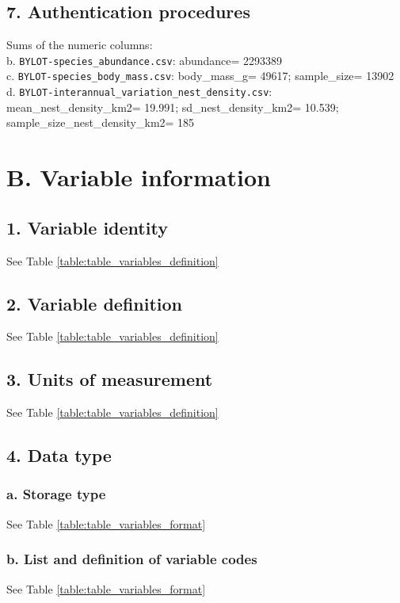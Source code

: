\documentclass[a4paper,twoside,12pt]{article}
\begin{document}
                        \subsection*{7. Authentication procedures}
                        Sums of the numeric columns: \\
                        b. \texttt{BYLOT-species\_abundance.csv}: abundance= 2293389\\
                        c. \texttt{BYLOT-species\_body\_mass.csv}: body\_mass\_g= 49617; sample\_size= 13902\\
                        d. \texttt{BYLOT-interannual\_variation\_nest\_density.csv}: mean\_nest\_density\_km2= 19.991; sd\_nest\_density\_km2= 10.539; sample\_size\_nest\_density\_km2= 185
                        
    \section*{B. Variable information}
                \subsection*{1. Variable identity} See Table \ref{table:table_variables_definition}
        \subsection*{2. Variable definition} See Table \ref{table:table_variables_definition}
        \subsection*{3. Units of measurement} See Table \ref{table:table_variables_definition}
        \newpage
        
        
       \newpage
        
        \subsection*{4. Data type}
                    \subsubsection*{a. Storage type} See Table \ref{table:table_variables_format}
                    \subsubsection*{b. List and definition of variable codes} See Table \ref{table:table_variables_format}
\end{document}
